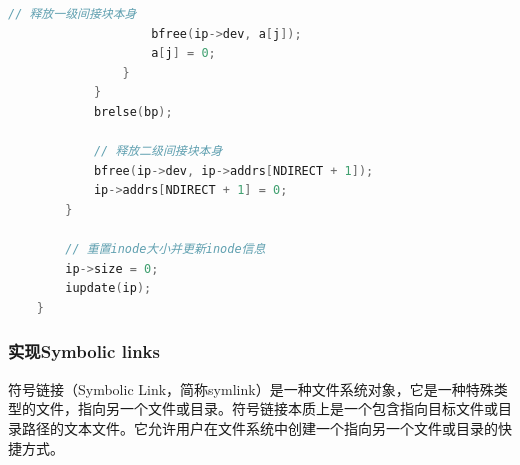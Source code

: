 \begin{enumerate}
\begin{lstlisting}[language=c,title=对itrunc函数的修改]
                    // 释放一级间接块本身
                    bfree(ip->dev, a[j]);
                    a[j] = 0;
                }
            }
            brelse(bp);
        
            // 释放二级间接块本身
            bfree(ip->dev, ip->addrs[NDIRECT + 1]);
            ip->addrs[NDIRECT + 1] = 0;
        }
    
        // 重置inode大小并更新inode信息
        ip->size = 0;
        iupdate(ip);
    }    
    \end{lstlisting}
\end{enumerate}

\subsubsection{实现Symbolic links}
符号链接（Symbolic Link，简称symlink）是一种文件系统对象，它是一种特殊类型的文件，指向另一个文件或目录。符号链接本质上是一个包含指向目标文件或目录路径的文本文件。它允许用户在文件系统中创建一个指向另一个文件或目录的快捷方式。

